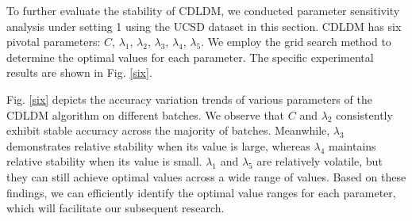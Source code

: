 \documentclass[a4paper]{cas-sc}
\begin{document}
To further evaluate the stability of CDLDM, we conducted parameter sensitivity analysis under setting 1 using the UCSD dataset in this section.
CDLDM has six pivotal parameters: $C$, $\lambda_1$, $\lambda_2$, $\lambda_3$, $\lambda_4$, $\lambda_5$. 
We employ the grid search method to determine the optimal values for each parameter.
The specific experimental results are shown in Fig. \ref{six}.

Fig. \ref{six} depicts the accuracy variation trends of various parameters of the CDLDM algorithm on different batches.
We observe that $C$ and $\lambda_2$ consistently exhibit stable accuracy across the majority of batches. Meanwhile, $\lambda_3$ demonstrates relative stability when its value is large, whereas $\lambda_4$ maintains relative stability when its value is small.
$\lambda_1$ and $\lambda_5$ are relatively volatile, but they can still achieve optimal values across a wide range of values.
Based on these findings, we can efficiently identify the optimal value ranges for each parameter, which will facilitate our subsequent research.
\end{document}
